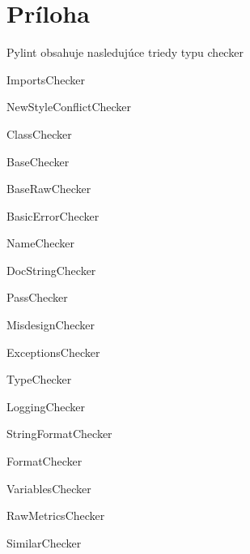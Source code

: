 \documentclass[11pt,oneside,final]{fithesis2}
\begin{document}
	
	


\chapter{Príloha}



		Pylint obsahuje nasledujúce triedy typu checker
		
			    \begin{list}{•}{}
					\item ImportsChecker
					\item NewStyleConflictChecker
					\item ClassChecker
					\item BaseChecker
					\item BaseRawChecker
					\item BasicErrorChecker
					\item NameChecker
					\item DocStringChecker
					\item PassChecker
					\item MisdesignChecker
					\item ExceptionsChecker
					\item TypeChecker
					\item LoggingChecker
					\item StringFormatChecker
					\item FormatChecker
					\item VariablesChecker
					\item RawMetricsChecker
					\item SimilarChecker
    			\end{list}
\end{document}
